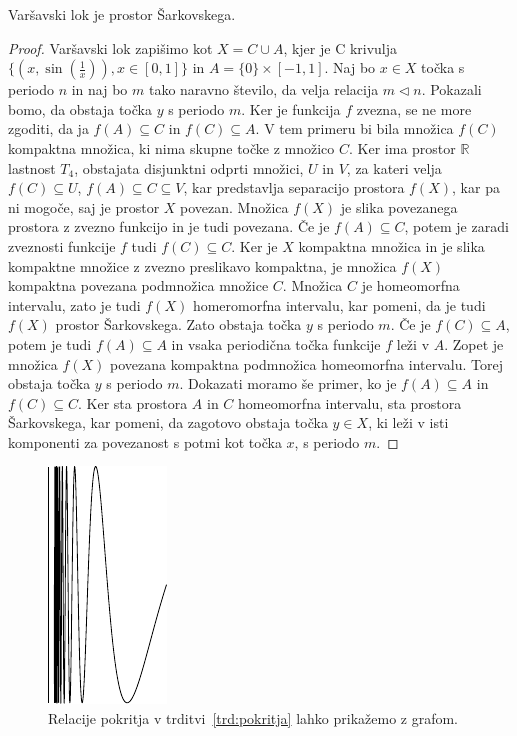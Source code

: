 \documentclass[mat2]{fmfdelo}
\newcommand{\R}{\mathbb R}
\begin{document}
\begin{trditev}
Varšavski lok je prostor Šarkovskega.
\end{trditev}
\begin{proof}
Varšavski lok zapišimo kot $X = C \cup A$, kjer je C krivulja $\{(x, \sin(\frac{1}{x})), x\in [0, 1]\}$ in $A= \{0\} \times [-1, 1]$. Naj bo $x \in X$ točka s periodo $n$ in naj bo $m$ tako naravno število, da velja relacija $m \triangleleft n$. Pokazali bomo, da obstaja točka $y$ s periodo $m$. Ker je funkcija $f$ zvezna, se ne more zgoditi, da ja $f(A) \subseteq C$ in $f(C) \subseteq A$. V tem primeru bi bila množica $f(C)$ kompaktna množica, ki nima skupne točke z množico $C$. Ker ima prostor $\R$ lastnost $T_4$, obstajata disjunktni odprti množici, $U$ in $V$, za kateri velja $f(C) \subseteq U$, $f(A) \subseteq C \subseteq V$, kar predstavlja separacijo prostora $f(X)$, kar pa ni mogoče, saj je prostor $X$ povezan. Množica $f(X)$ je slika povezanega prostora z zvezno funkcijo in je tudi povezana. Če je $f(A) \subseteq C$, potem je zaradi zveznosti funkcije $f$ tudi $f(C) \subseteq C$. Ker je $X$ kompaktna množica in je slika kompaktne množice z zvezno preslikavo kompaktna, je množica $f(X)$ kompaktna povezana podmnožica množice $C$. Množica $C$ je homeomorfna intervalu, zato je tudi $f(X)$ homeromorfna intervalu, kar pomeni, da je tudi $f(X)$ prostor Šarkovskega. Zato obstaja točka $y$ s periodo $m$. Če je $f (C) \subseteq A $, potem je tudi $f (A) \subseteq A $ in vsaka periodična točka funkcije $f$ leži v $A$.  Zopet je množica $f(X)$ povezana kompaktna podmnožica homeomorfna intervalu. Torej obstaja točka $y$ s periodo $m$. 
Dokazati moramo še primer, ko je $f (A) \subseteq A $ in $f (C) \subseteq C $. Ker sta prostora $A$ in $C$ homeomorfna intervalu, sta prostora Šarkovskega, kar pomeni, da zagotovo obstaja točka $y \in X$, ki leži v isti komponenti za povezanost s potmi kot točka $x$, s periodo $m$.
\end{proof}

\begin{figure}[h]
  \centering
  \includegraphics{images/varsavskilok.pdf}
  \caption[Primer vektorske slike.]{Relacije pokritja v trditvi~\ref{trd:pokritja} lahko prikažemo z grafom.}
  \label{fig:varsavski_lok}
\end{figure}
\end{document}
